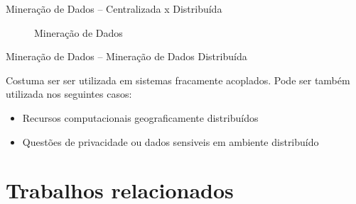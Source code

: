 \documentclass[hyperref={pdfpagelabels=false}]{beamer}
\begin{document}
\begin{frame}
    
    \Large{Mineração de Dados -- Centralizada x Distribuída}
    \begin{figure}
     \hfill
     \caption{Mineração de Dados}
     \end{figure}
     
\end{frame}

\begin{frame}

    
    \Large{Mineração de Dados -- Mineração de Dados Distribuída}\linebreak
    \normalsize
   
    Costuma ser ser utilizada em sistemas fracamente acoplados. \cite{goldschmidt2015data}
	\linebreak \linebreak Pode ser também utilizada nos seguintes casos: \cite{016-000} \begin{itemize}
    	\item Recursos computacionais geograficamente distribuídos
        \item Questões de privacidade ou dados sensiveis em ambiente distribuído
    \end{itemize}
\end{frame}

\section {Trabalhos relacionados}
\end{document}
